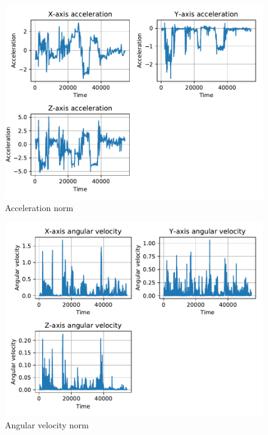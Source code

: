 \begin{figure}[htp]
\includegraphics[scale=0.55]{acceleration_susanna.pdf}
\caption{Acceleration norm}
\label{fig:acc}
\end{figure}

\begin{figure}[htp]
\includegraphics[scale=0.55]{angular_velocity_susanna.pdf}
\caption{Angular velocity norm}
\label{fig:gyr}
\end{figure}

